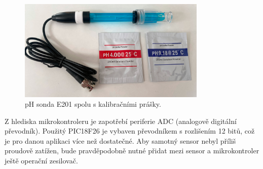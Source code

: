 \begin{figure}[h!]
    \centering
    \includegraphics[width=0.8\textwidth]{obrazky/foto/ph_sonda.jpeg}
    \caption{pH sonda E201 spolu s kalibračními prášky.}
    \label{fig:obrazky-foto-ph_sonda-jpeg}
\end{figure}

Z hlediska mikrokontroleru je zapotřebí periferie ADC (analogově digitální převodník). Použitý PIC18F26 je vybaven převodníkem s rozlišením  12 bitů, což je pro danou aplikaci více než dostatečné. Aby samotný sensor nebyl příliš proudově zatížen, bude pravděpodobně nutné přidat mezi sensor a mikrokontroler ještě operační zesilovač. 




